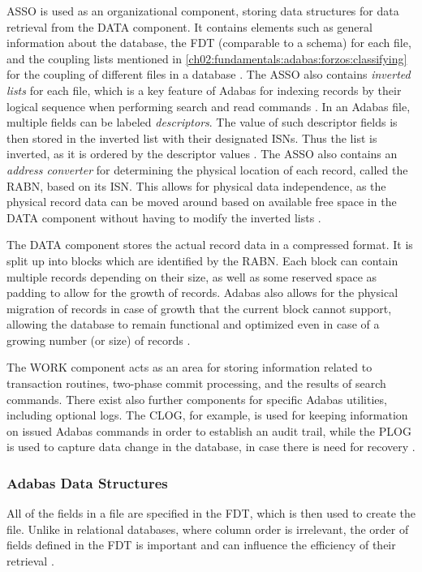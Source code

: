 ASSO is used as an organizational component, storing data structures for data retrieval from the DATA component. It contains elements such as general information about the database, the \ac{FDT} (comparable to a schema) for each file, and the coupling lists mentioned in \ref{ch02:fundamentals:adabas:forzos:classifying} for the coupling of different files in a database \cite{adabasconcepts}. The ASSO also contains \textit{inverted lists} for each file, which is a key feature of Adabas for indexing records by their logical sequence when performing search and read commands \cite{adabashybrid}. In an Adabas file, multiple fields can be labeled \textit{descriptors}. The value of such descriptor fields is then stored in the inverted list with their designated \ac{ISN}s. Thus the list is inverted, as it is ordered by the descriptor values \cite{adabasconcepts}. The ASSO also contains an \textit{address converter} for determining the physical location of each record, called the \ac{RABN}, based on its \ac{ISN}. This allows for physical data independence, as the physical record data can be moved around based on available free space in the DATA component without having to modify the inverted lists \cite{adabashybrid}. 

The DATA component stores the actual record data in a compressed format. It is split up into blocks which are identified by the \ac{RABN}. Each block can contain multiple records depending on their size, as well as some reserved space as padding to allow for the growth of records. Adabas also allows for the physical migration of records in case of growth that the current block cannot support, allowing the database to remain functional and optimized even in case of a growing number (or size) of records \cite{adabasconcepts}.

The WORK component acts as an area for storing information related to transaction routines, two-phase commit processing, and the results of search commands. There exist also further components for specific Adabas utilities, including optional logs. The \ac{CLOG}, for example, is used for keeping information on issued Adabas commands in order to establish an audit trail, while the \ac{PLOG} is used to capture data change in the database, in case there is need for recovery \cite{adabasconcepts}.

\subsubsection{Adabas Data Structures}
\label{ch02:fundamentals:adabas:forzos:datastructures}
All of the fields in a file are specified in the \ac{FDT}, which is then used to create the file. Unlike in relational databases, where column order is irrelevant, the order of fields defined in the \ac{FDT} is important and can influence the efficiency of their retrieval \cite{storr1994effizienter}.

